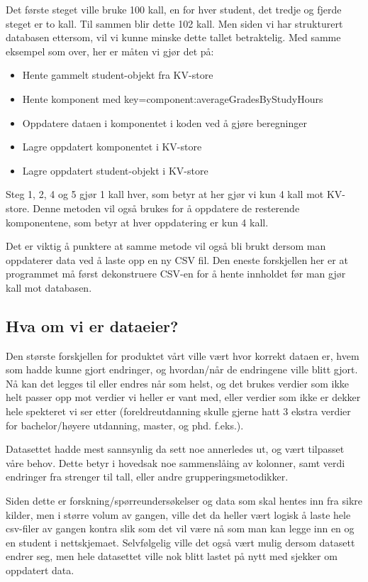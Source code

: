 Det første steget ville bruke 100 kall, en for hver student, det tredje og fjerde steget er to kall. Til sammen blir dette 102 kall. Men siden vi har strukturert databasen ettersom, vil vi kunne minske dette tallet betraktelig. Med samme eksempel som over, her er måten vi gjør det på:

\begin{itemize}
  \item Hente gammelt student-objekt fra KV-store
  \item Hente komponent med key=component:averageGradesByStudyHours
  \item Oppdatere dataen i komponentet i koden ved å gjøre beregninger
  \item Lagre oppdatert komponentet i KV-store
  \item Lagre oppdatert student-objekt i KV-store
\end{itemize}

Steg 1, 2, 4 og 5 gjør 1 kall hver, som betyr at her gjør vi kun 4 kall mot KV-store. Denne metoden vil også brukes for å oppdatere de resterende komponentene, som betyr at hver oppdatering er kun 4 kall.

Det er viktig å punktere at samme metode vil også bli brukt dersom man oppdaterer data ved å laste 
opp en ny CSV fil. Den eneste forskjellen her er at programmet må først dekonstruere CSV-en for å hente innholdet før man gjør kall mot databasen.

\subsection{Hva om vi er dataeier?}
Den største forskjellen for produktet vårt ville vært hvor korrekt dataen er, hvem som hadde kunne gjort endringer, og hvordan/når de endringene ville blitt gjort. Nå kan det legges til eller endres når som helst, og det brukes verdier som ikke helt passer opp mot verdier vi heller er vant med, eller verdier som ikke er dekker hele spekteret vi ser etter (foreldreutdanning skulle gjerne hatt 3 ekstra verdier for bachelor/høyere utdanning, master, og phd. f.eks.).

Datasettet hadde mest sannsynlig da sett noe annerledes ut, og vært tilpasset våre behov. Dette betyr i hovedsak noe sammenslåing av kolonner, samt verdi endringer fra strenger til tall, eller andre grupperingsmetodikker.

Siden dette er forskning/spørreundersøkelser og data som skal hentes inn fra sikre kilder, men i større volum av gangen, ville det da heller vært logisk å laste hele csv-filer av gangen kontra slik som det vil være nå som man kan legge inn en og en student i nettskjemaet. Selvfølgelig ville det også vært mulig dersom datasett endrer seg, men hele datasettet ville nok blitt lastet på nytt med sjekker om oppdatert data.

